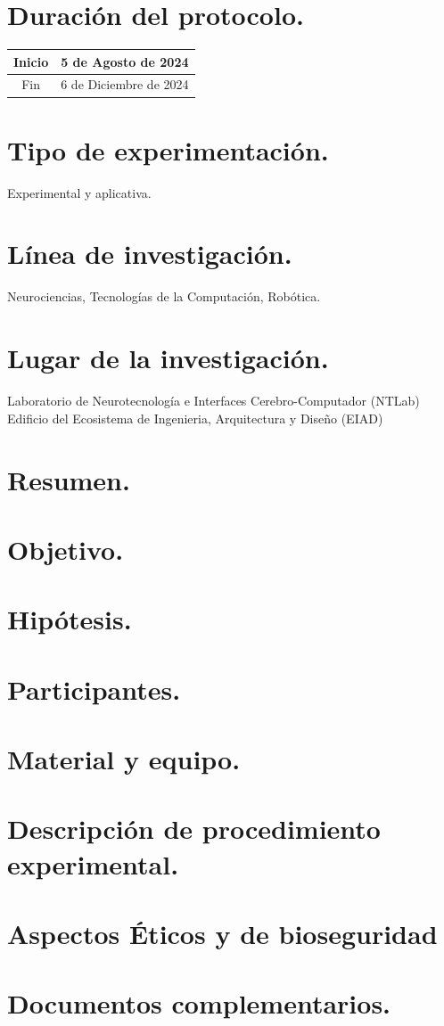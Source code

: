 \documentclass[12pt]{article}
\begin{document}
\section{Duración del protocolo.}

\begin{table}[h!]
    \centering
    \begin{tabular}{|c|c|} \hline
        Inicio & 5 de Agosto de 2024 \\ \hline
        Fin & 6 de Diciembre de 2024 \\ \hline
    \end{tabular}
\end{table}

\section{Tipo de experimentación.}
    Experimental y aplicativa.

\section{Línea de investigación.}
    Neurociencias, Tecnologías de la Computación, Robótica.

\section{Lugar de la investigación.}
    Laboratorio de Neurotecnología e Interfaces Cerebro-Computador (NTLab)
    Edificio del Ecosistema de Ingenieria, Arquitectura y Diseño (EIAD)

\section{Resumen.}
\section{Objetivo.}
\section{Hipótesis.}
\section{Participantes.}
\section{Material y equipo.}
\section{Descripción de procedimiento experimental.}
\section{Aspectos Éticos y de bioseguridad}
\section{Documentos complementarios.}
\end{document}
